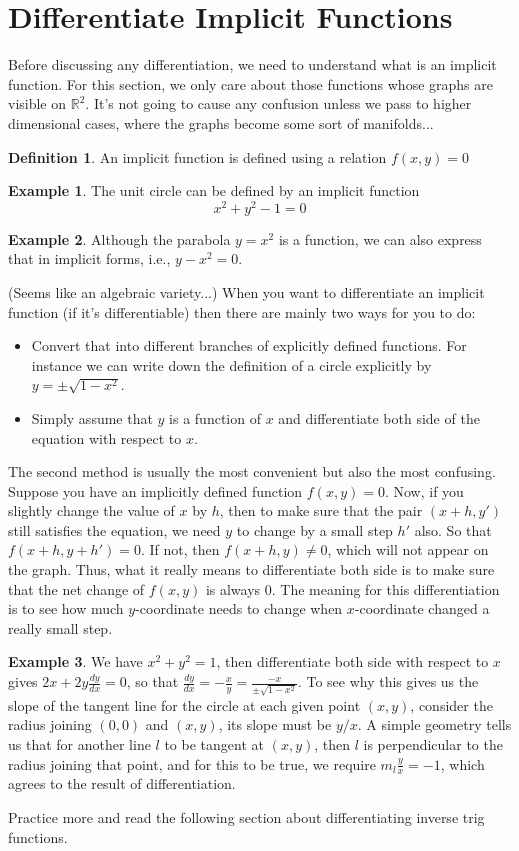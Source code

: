 \documentclass{article}
\theoremstyle{definition}
\theoremstyle{definition}
\newtheorem{definition}{Definition}
\theoremstyle{definition}
\theoremstyle{definition}
\theoremstyle{definition}
\theoremstyle{definition}
\newtheorem{example}{Example}
\theoremstyle{definition}
\theoremstyle{definition}
\theoremstyle{definition}
\begin{document}
\section{Differentiate Implicit Functions}
Before discussing any differentiation, we need to understand what is an implicit function. For this section, we only care about those functions whose graphs are visible on $\mathbb{R}^2$. It's not going to cause any confusion unless we pass to higher dimensional cases, where the graphs become some sort of manifolds...
\begin{definition}
An implicit function is defined using a relation $f(x,y)=0$
\end{definition}
\begin{example}
The unit circle can be defined by an implicit function
\[x^2+y^2-1=0\]
\end{example}
\begin{example}
Although the parabola $y=x^2$ is a function, we can also express that in implicit forms, i.e., $y-x^2=0$.
\end{example}
(Seems like an algebraic variety...)
When you want to differentiate an implicit function (if it's differentiable) then there are mainly two ways for you to do:
\begin{itemize}
    \item Convert that into different branches of explicitly defined functions. For instance we can write down the definition of a circle explicitly by $y=\pm\sqrt{1-x^2}$.
    \item Simply assume that $y$ is a function of $x$ and differentiate both side of the equation with respect to $x$.
\end{itemize}
The second method is usually the most convenient but also the most confusing. Suppose you have an implicitly defined function $f(x,y)=0$. Now, if you slightly change the value of $x$ by $h$, then to make sure that the pair $(x+h,y')$ still satisfies the equation, we need $y$ to change by a small step $h'$ also. So that $f(x+h,y+h')=0$. If not, then $f(x+h,y)\neq 0$, which will not appear on the graph. Thus, what it really means to differentiate both side is to make sure that the net change of $f(x,y)$ is always $0$. The meaning for this differentiation is to see how much $y$-coordinate needs to change when $x$-coordinate changed a really small step.
\begin{example}
We have $x^2+y^2=1$, then differentiate both side with respect to $x$ gives $2x+2y\frac{dy}{dx}=0$, so that $\frac{dy}{dx}=-\frac{x}{y}=\frac{-x}{\pm\sqrt{1-x^2}}$. To see why this gives us the slope of the tangent line for the circle at each given point $(x,y)$, consider the radius joining $(0,0)$ and $(x,y)$, its slope must be $y/x$. A simple geometry tells us that for another line $l$ to be tangent at $(x,y)$, then $l$ is perpendicular to the radius joining that point, and for this to be true, we require $m_l\frac{y}{x}=-1$, which agrees to the result of differentiation.
\end{example}
Practice more and read the following section about differentiating inverse trig functions.
\end{document}
